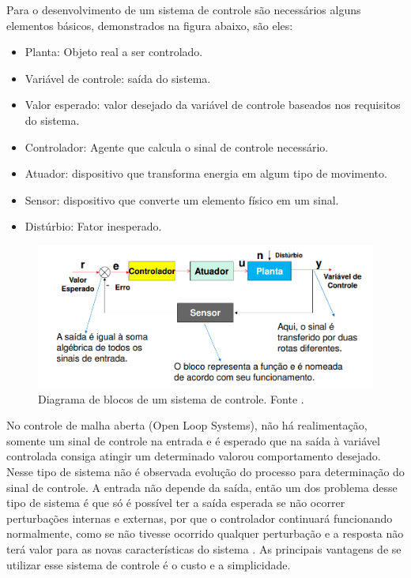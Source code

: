 		Para o desenvolvimento de um sistema de controle são necessários alguns elementos básicos, demonstrados na figura abaixo, são eles:

		\begin{itemize}
			\item Planta: Objeto real a ser controlado.
			\item Variável de controle: saída do sistema.
			\item Valor esperado: valor desejado da variável de controle baseados nos requisitos do sistema.
			\item Controlador: Agente que calcula o sinal de controle necessário.
			\item Atuador: dispositivo que transforma energia em algum tipo de movimento.
			\item Sensor: dispositivo que converte um elemento físico em um sinal.
			\item Distúrbio: Fator inesperado.
		\end{itemize}

		\begin{figure}[H]
			\centering
			\includegraphics[scale=0.4]{figuras/diagrama_blocos_controle.png}
			\caption{Diagrama de blocos de um sistema de controle. Fonte \cite{mello}.}
			\label{img:diagrama_sistema_controle}
		\end{figure}

		No controle de malha aberta (Open Loop Systems), não há realimentação, somente um sinal de controle na entrada e é esperado que na saída à variável controlada consiga atingir um determinado valorou comportamento desejado. Nesse tipo de sistema não é observada evolução do processo para determinação do sinal de controle. A entrada não depende da saída, então um dos problema desse tipo de sistema é que só é possível ter a saída esperada se não ocorrer perturbações internas e externas, por que o controlador continuará funcionando normalmente, como se não tivesse ocorrido qualquer perturbação e a resposta não terá valor para as novas características do sistema \cite{silva}. As principais vantagens de se utilizar esse sistema de controle é o custo e a simplicidade.

